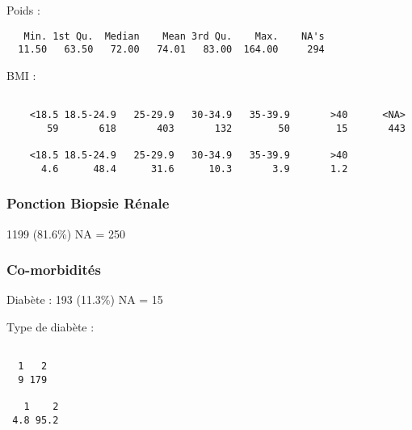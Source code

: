 \documentclass[11pt,a4paper]{article}\usepackage[]{graphicx}\usepackage[]{color}
\makeatletter
\newenvironment{kframe}{%
 \def\at@end@of@kframe{}%
 \ifinner\ifhmode%
  \def\at@end@of@kframe{\end{minipage}}%
  \begin{minipage}{\columnwidth}%
 \fi\fi%
 \def\FrameCommand##1{\hskip\@totalleftmargin \hskip-\fboxsep
 \colorbox{shadecolor}{##1}\hskip-\fboxsep
     \hskip-\linewidth \hskip-\@totalleftmargin \hskip\columnwidth}%
 \MakeFramed {\advance\hsize-\width
   \@totalleftmargin\z@ \linewidth\hsize
   \@setminipage}}%
 {\par\unskip\endMakeFramed%
 \at@end@of@kframe}
\newenvironment{knitrout}{}{} %
\makeatother
\begin{document}
Poids :

\begin{knitrout}
\color{fgcolor}\begin{kframe}
\begin{verbatim}
   Min. 1st Qu.  Median    Mean 3rd Qu.    Max.    NA's 
  11.50   63.50   72.00   74.01   83.00  164.00     294 
\end{verbatim}
\end{kframe}
\end{knitrout}

BMI :

\begin{knitrout}
\color{fgcolor}\begin{kframe}
\begin{verbatim}

    <18.5 18.5-24.9   25-29.9   30-34.9   35-39.9       >40      <NA> 
       59       618       403       132        50        15       443 

    <18.5 18.5-24.9   25-29.9   30-34.9   35-39.9       >40 
      4.6      48.4      31.6      10.3       3.9       1.2 
\end{verbatim}
\end{kframe}
\end{knitrout}

      \subsubsection{Ponction Biopsie Rénale}

1199 (81.6\%) NA = 250

      \subsubsection{Co-morbidités}



Diabète : 193 (11.3\%) NA = 15

Type de diabète :
\begin{knitrout}
\color{fgcolor}\begin{kframe}
\begin{verbatim}

  1   2 
  9 179 

   1    2 
 4.8 95.2 
\end{verbatim}
\end{kframe}
\end{knitrout}
\end{document}
